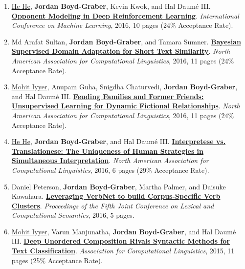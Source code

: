 {\begin{enumerate}
	 \item \underline{\href{https://hhexiy.github.io/}{He He}}, {\bf Jordan Boyd-Graber}, Kevin Kwok, and Hal {Daum\'{e} III}.  {\bf \href{http://cs.umd.edu/~jbg//docs/2016_icml_opponent.pdf}{Opponent Modeling in Deep Reinforcement Learning}}.  \emph{International Conference on Machine Learning}, 2016, 10 pages (24\% Acceptance Rate).

	 \item Md Arafat Sultan, {\bf Jordan Boyd-Graber}, and Tamara Sumner.  {\bf \href{http://cs.umd.edu/~jbg//docs/2016_naacl_sts.pdf}{Bayesian Supervised Domain Adaptation for Short Text Similarity}}.  \emph{North American Association for Computational Linguistics}, 2016, 11 pages (24\% Acceptance Rate).

	 \item \underline{\href{https://people.cs.umass.edu/~miyyer/}{Mohit Iyyer}}, Anupam Guha, Snigdha Chaturvedi, {\bf Jordan Boyd-Graber}, and Hal {Daum\'{e} III}.  {\bf \href{http://cs.umd.edu/~jbg//docs/2016_naacl_relationships.pdf}{Feuding Families and Former Friends: Unsupervised Learning for Dynamic Fictional Relationships}}.  \emph{North American Association for Computational Linguistics}, 2016, 11 pages (24\% Acceptance Rate).

	 \item \underline{\href{https://hhexiy.github.io/}{He He}}, {\bf Jordan Boyd-Graber}, and Hal {Daum\'{e} III}.  {\bf \href{http://cs.umd.edu/~jbg//docs/2016_naacl_interpretese.pdf}{Interpretese vs. Translationese: The Uniqueness of Human Strategies in Simultaneous Interpretation}}.  \emph{North American Association for Computational Linguistics}, 2016, 6 pages (29\% Acceptance Rate).

	 \item Daniel Peterson, {\bf Jordan Boyd-Graber}, Martha Palmer, and Daisuke Kawahara.  {\bf \href{https://aclanthology.org/S16-2012/}{Leveraging {V}erb{N}et to build Corpus-Specific Verb Clusters}}.  \emph{Proceedings of the Fifth Joint Conference on Lexical and Computational Semantics}, 2016, 5 pages.

	 \item \underline{\href{https://people.cs.umass.edu/~miyyer/}{Mohit Iyyer}}, Varun Manjunatha, {\bf Jordan Boyd-Graber}, and Hal {Daum\'{e} III}.  {\bf \href{http://cs.umd.edu/~jbg//docs/2015_acl_dan.pdf}{Deep Unordered Composition Rivals Syntactic Methods for Text Classification}}.  \emph{Association for Computational Linguistics}, 2015, 11 pages (25\% Acceptance Rate).


\end{enumerate}}
